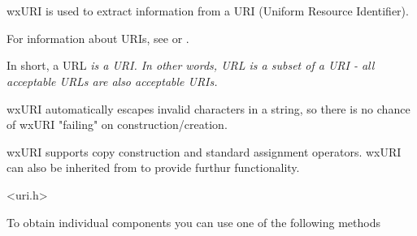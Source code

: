 
\section{}\label{wxuri}

wxURI is used to extract information from
a URI (Uniform Resource Identifier).

For information about URIs, see 
 or 
.

In short, a URL \em{is} a URI.  In other
words, URL is a subset of a URI - all 
acceptable URLs are also acceptable URIs.

wxURI automatically escapes invalid characters in a string,
so there is no chance of wxURI "failing" on construction/creation.

wxURI supports copy construction and standard assignment
operators.  wxURI can also be inherited from to provide
furthur functionality.




<uri.h>


\label{obtainingwxuricomponents}

To obtain individual components you can use 
one of the following methods

\\
\\
\\
\\
\\
\\

